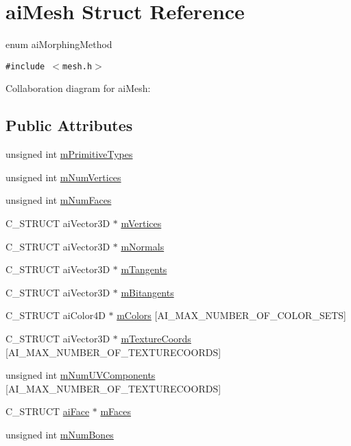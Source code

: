 \hypertarget{structai_mesh}{
\section{aiMesh Struct Reference}
\label{structai_mesh}
}
enum aiMorphingMethod  


{\tt \#include $<$mesh.h$>$}

Collaboration diagram for aiMesh:\subsection*{Public Attributes}
\begin{CompactItemize}
\item 
unsigned int \hyperlink{structai_mesh_99d66ac0a444068c1b252b30265cbf53}{mPrimitiveTypes}
\item 
unsigned int \hyperlink{structai_mesh_b34b7b5941e6636f1c08f615cbb072ef}{mNumVertices}
\item 
unsigned int \hyperlink{structai_mesh_eed22ee6963b79548f3877b3c905518e}{mNumFaces}
\item 
C\_\-STRUCT aiVector3D $\ast$ \hyperlink{structai_mesh_fd4588abb3e1c72821ae0234a3850662}{mVertices}
\item 
C\_\-STRUCT aiVector3D $\ast$ \hyperlink{structai_mesh_ec81b496b4d93838cef038933dabe9b9}{mNormals}
\item 
C\_\-STRUCT aiVector3D $\ast$ \hyperlink{structai_mesh_f367ff78bd69f3e83d7edc8ad67dc5df}{mTangents}
\item 
C\_\-STRUCT aiVector3D $\ast$ \hyperlink{structai_mesh_b2a81bfe1731f01271ebab274a8f01c4}{mBitangents}
\item 
C\_\-STRUCT aiColor4D $\ast$ \hyperlink{structai_mesh_d9215f67bd0c2277b10775a8adb66b96}{mColors} \mbox{[}AI\_\-MAX\_\-NUMBER\_\-OF\_\-COLOR\_\-SETS\mbox{]}
\item 
C\_\-STRUCT aiVector3D $\ast$ \hyperlink{structai_mesh_4a50b11d00ef50f419c75cab0f6bddd6}{mTextureCoords} \mbox{[}AI\_\-MAX\_\-NUMBER\_\-OF\_\-TEXTURECOORDS\mbox{]}
\item 
unsigned int \hyperlink{structai_mesh_635c631a6e66d32989d6b25b2a892d86}{mNumUVComponents} \mbox{[}AI\_\-MAX\_\-NUMBER\_\-OF\_\-TEXTURECOORDS\mbox{]}
\item 
C\_\-STRUCT \hyperlink{structai_face}{aiFace} $\ast$ \hyperlink{structai_mesh_5a65fbc7fdea7f8d36f39047425ece07}{mFaces}
\item 
unsigned int \hyperlink{structai_mesh_0f9d5425b6300e32a842a94f943fd79e}{mNumBones}
\item 

\end{CompactItemize}
